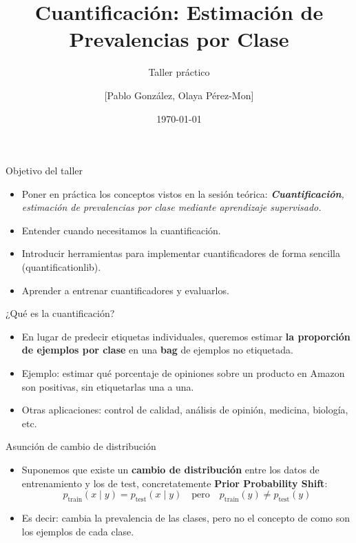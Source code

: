 \documentclass{beamer}
\title{Cuantificación: Estimación de Prevalencias por Clase}
\subtitle{Taller práctico}
\author{[Pablo González, Olaya Pérez-Mon]}
\institute{[Universidad de Oviedo]}
\date{\today}
\begin{document}
\frame{\titlepage}

\begin{frame}{Objetivo del taller}
\begin{itemize}
    \item Poner en práctica los conceptos vistos en la sesión teórica: \textit{\textbf{Cuantificación}, estimación de prevalencias por clase mediante aprendizaje supervisado.}
    \item Entender cuando necesitamos la cuantificación.
    \item Introducir herramientas para implementar cuantificadores de forma sencilla (quantificationlib).
    \item Aprender a entrenar cuantificadores y evaluarlos.
\end{itemize}
\end{frame}

\begin{frame}{¿Qué es la cuantificación?}
\begin{itemize}
    \item En lugar de predecir etiquetas individuales, queremos estimar \textbf{la proporción de ejemplos por clase} en una \textbf{bag} de ejemplos no etiquetada.
    \item Ejemplo: estimar qué porcentaje de opiniones sobre un producto en Amazon son positivas, sin etiquetarlas una a una.
    \item Otras aplicaciones: control de calidad, análisis de opinión, medicina, biología, etc.
\end{itemize}
\end{frame}

\begin{frame}{Asunción de cambio de distribución}
\begin{itemize}
    \item Suponemos que existe un \textbf{cambio de distribución} entre los datos de entrenamiento y los de test, concretatemente \textbf{Prior Probability Shift}:
    \[
    p_{\text{train}}(x \mid y) = p_{\text{test}}(x \mid y) \quad \text{pero} \quad p_{\text{train}}(y) \neq p_{\text{test}}(y)
    \]
    \item Es decir: cambia la prevalencia de las clases, pero no el concepto de como son los ejemplos de cada clase.
\end{itemize}
\end{frame}
\end{document}
